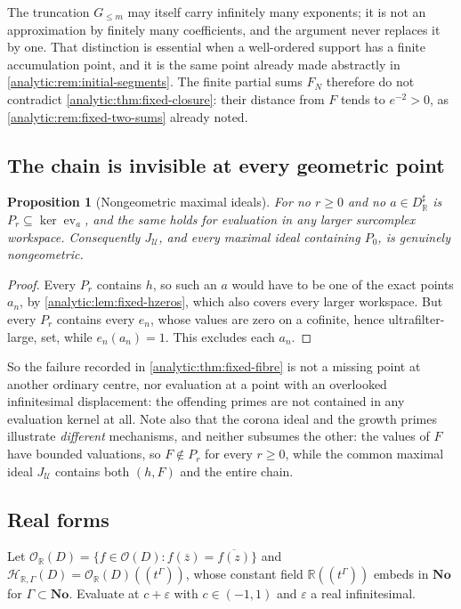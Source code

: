 \documentclass[11pt,letterpaper]{article}
\newtheorem{proposition}[theorem]{Proposition}
\theoremstyle{definition}
\theoremstyle{remark}
\newcommand{\R}{\mathbb R}
\newcommand{\No}{\mathbf{No}}
\newcommand{\HH}{\mathcal H}
\newcommand{\UU}{\mathcal U}
\newcommand{\OO}{\mathcal O}
\newcommand{\ev}{\operatorname{ev}}
\numberwithin{equation}{section}
\begin{document}
The truncation $G_{\le m}$ may itself carry infinitely many exponents; it
is not an approximation by finitely many coefficients, and the argument
never replaces it by one. That distinction is essential when a
well-ordered support has a finite accumulation point, and it is the same
point already made abstractly in
\cref{analytic:rem:initial-segments}. The finite partial sums $F_N$
therefore do not contradict \cref{analytic:thm:fixed-closure}: their
distance from $F$ tends to $e^{-2}>0$, as
\cref{analytic:rem:fixed-two-sums} already noted.

\subsection{The chain is invisible at every geometric point}
\begin{proposition}[Nongeometric maximal ideals]
\label{analytic:prop:fixed-invisible}
For no $r\ge0$ and no $a\in D^\sharp_\R$ is $P_r\subseteq\ker\ev_a$, and
the same holds for evaluation in any larger surcomplex workspace.
Consequently $J_\UU$, and every maximal ideal containing $P_0$, is
genuinely nongeometric.
\end{proposition}
\begin{proof}
Every $P_r$ contains $h$, so such an $a$ would have to be one of the exact
points $a_n$, by \cref{analytic:lem:fixed-hzeros}, which also covers every
larger workspace. But every $P_r$ contains every $e_n$, whose values are
zero on a cofinite, hence ultrafilter-large, set, while $e_n(a_n)=1$. This
excludes each $a_n$.
\end{proof}

So the failure recorded in \cref{analytic:thm:fixed-fibre} is not a missing
point at another ordinary centre, nor evaluation at a point with an
overlooked infinitesimal displacement: the offending primes are not
contained in any evaluation kernel at all. Note also that the corona ideal
and the growth primes illustrate \emph{different} mechanisms, and neither
subsumes the other: the values of $F$ have bounded valuations, so
$F\notin P_r$ for every $r\ge0$, while the common maximal ideal $J_\UU$
contains both $(h,F)$ and the entire chain.

\subsection{Real forms}\label{analytic:subsec:fixed-real}
Let
$\OO_\R(D)=\{f\in\OO(D):f(\overline z)=\overline{f(z)}\}$ and
$\HH_{\R,\Gamma}(D)=\OO_\R(D)((t^\Gamma))$, whose constant field
$\R((t^\Gamma))$ embeds in $\No$ for $\Gamma\subset\No$. Evaluate at
$c+\varepsilon$ with $c\in(-1,1)$ and $\varepsilon$ a real infinitesimal.
\end{document}
